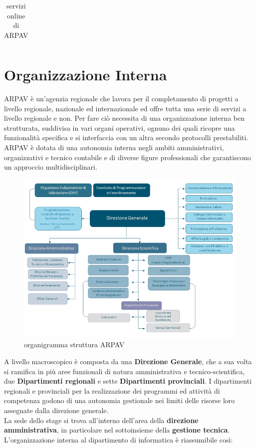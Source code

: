 \begin{longtable}{p{}|p{}}
\caption{servizi online di ARPAV}
\end{longtable}

\newpage

\section{Organizzazione Interna}

ARPAV è un'agenzia regionale che lavora per il completamento di progetti a livello regionale, nazionale ed internazionale ed offre tutta una serie di servizi a livello regionale e non. Per fare ciò necessita di una  organizzazione interna ben strutturata, suddivisa in vari organi operativi, ognuno dei quali ricopre una funzionalità specifica e si interfaccia con un altra secondo protocolli prestabiliti. ARPAV è dotata di una autonomia interna negli ambiti amministrativi, organizzativi e tecnico contabile e di diverse figure professionali che garantiscono un approccio multidisciplinari.

\begin{figure}[htbp]
\centering
\includegraphics[scale=0.7]{./capitoli/capitolo1/img/organigramma}

\caption{organigramma struttura ARPAV}

\end{figure}

A livello macroscopico è composta da una \textbf{Direzione Generale}, che a sua volta si ramifica in più aree funzionali di natura amministrativa e tecnico-scientifica, due \textbf{Dipartimenti regionali} e sette \textbf{Dipartimenti provinciali}. I dipartimenti regionali e provinciali per la realizzazione dei programmi ed attività di competenza godono di una autonomia gestionale nei limiti delle risorse loro assegnate dalla direzione generale.\\
La sede dello stage si trova all'interno dell'area della \textbf{direzione amministrativa}, in particolare nel sottoinsieme della \textbf{gestione tecnica}.\\
L'organizzazione interna al dipartimento di informatica è riassumibile così:

